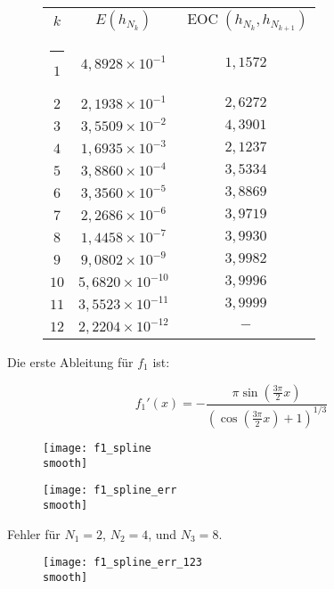 \documentclass[]{scrartcl}
\makeatletter
\newcommand{\thickhline}{%
    \noalign {\ifnum 0=`}\fi \hrule height 1pt
    \futurelet \reserved@a \@xhline
}
\makeatother
\begin{document}
 	\renewcommand{\arraystretch}{1.2}
 	\begin{figure}[H]
 		\centering
	 	\begin{tabular}{|c|c|c|}\hline
	 	$k$  & $E(h_{N_k})$ & $\operatorname{EOC}(h_{N_k},h_{N_{k+1}})$\\\thickhline
	 	$1$  & $4,8928\times10^{-1}$ & $1,1572$\\\hline
	 	$2$  & $2,1938\times10^{-1}$ & $2,6272$\\\hline
	 	$3$  & $3,5509\times10^{-2}$ & $4,3901$\\\hline
	 	$4$  & $1,6935\times10^{-3}$ & $2,1237$\\\hline
	 	$5$  & $3,8860\times10^{-4}$ & $3,5334$\\\hline
	 	$6$  & $3,3560\times10^{-5}$ & $3,8869$\\\hline
	 	$7$  & $2,2686\times10^{-6}$ & $3,9719$\\\hline
	 	$8$  & $1,4458\times10^{-7}$ & $3,9930$\\\hline
	 	$9$  & $9,0802\times10^{-9}$ & $3,9982$\\\hline
	 	$10$ & $5,6820\times10^{-10}$ & $3,9996$\\\hline
	 	$11$ & $3,5523\times10^{-11}$ & $3,9999$\\\hline
	 	$12$ & $2,2204\times10^{-12}$ & $-$\\\hline
	 	\end{tabular}
 	\end{figure}
 	\newpage
 	
 	Die erste Ableitung für $f_1$ ist:
 	
 	\[ f_1'(x)=-\frac{\pi \sin(\frac{3\pi}{2}x)}{(\cos(\frac{3\pi}{2}x)+1)^{1/3}}\]
 	
	\begin{figure}[H]
		\centering
		\begin{minipage}{0.5\textwidth}
			\texttt{[image: f1\_spline\\smooth]}
			\caption{}
		\end{minipage}
		\begin{minipage}{0.49\textwidth}
			\texttt{[image: f1\_spline\_err\\smooth]}
			\caption{}
		\end{minipage}
	\end{figure} 
	
	Fehler für $N_1=2$, $N_2=4$, und $N_3=8$.
 	
 	\begin{figure}[H]
 		\centering
		\texttt{[image: f1\_spline\_err\_123\\smooth]}
		\caption{}
 	\end{figure}
 	
\end{document}
